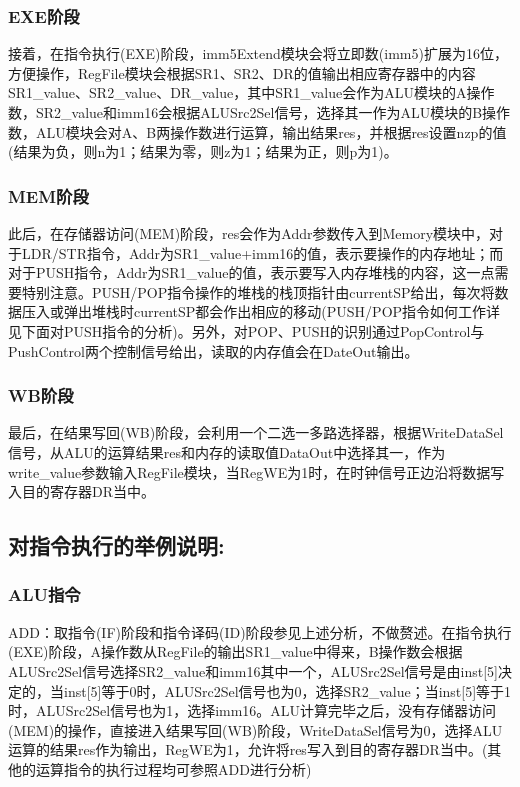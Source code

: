 \documentclass{article}
\begin{document}
\subsubsection{EXE阶段}
接着，在指令执行(EXE)阶段，imm5Extend模块会将立即数(imm5)扩展为16位，方便操作，RegFile模块会根据SR1、SR2、DR的值输出相应寄存器中的内容SR1\_value、SR2\_value、DR\_value，其中SR1\_value会作为ALU模块的A操作数，SR2\_value和imm16会根据ALUSrc2Sel信号，选择其一作为ALU模块的B操作数，ALU模块会对A、B两操作数进行运算，输出结果res，并根据res设置nzp的值(结果为负，则n为1；结果为零，则z为1；结果为正，则p为1)。

\subsubsection{MEM阶段}
此后，在存储器访问(MEM)阶段，res会作为Addr参数传入到Memory模块中，对于LDR/STR指令，Addr为SR1\_value+imm16的值，表示要操作的内存地址；而对于PUSH指令，Addr为SR1\_value的值，表示要写入内存堆栈的内容，这一点需要特别注意。PUSH/POP指令操作的堆栈的栈顶指针由currentSP给出，每次将数据压入或弹出堆栈时currentSP都会作出相应的移动(PUSH/POP指令如何工作详见下面对PUSH指令的分析)。另外，对POP、PUSH的识别通过PopControl与PushControl两个控制信号给出，读取的内存值会在DateOut输出。

\subsubsection{WB阶段}
最后，在结果写回(WB)阶段，会利用一个二选一多路选择器，根据WriteDataSel信号，从ALU的运算结果res和内存的读取值DataOut中选择其一，作为write\_value参数输入RegFile模块，当RegWE为1时，在时钟信号正边沿将数据写入目的寄存器DR当中。

\subsection{对指令执行的举例说明:}

\subsubsection{ALU指令}
ADD：取指令(IF)阶段和指令译码(ID)阶段参见上述分析，不做赘述。在指令执行(EXE)阶段，A操作数从RegFile的输出SR1\_value中得来，B操作数会根据ALUSrc2Sel信号选择SR2\_value和imm16其中一个，ALUSrc2Sel信号是由inst[5]决定的，当inst[5]等于0时，ALUSrc2Sel信号也为0，选择SR2\_value；当inst[5]等于1时，ALUSrc2Sel信号也为1，选择imm16。ALU计算完毕之后，没有存储器访问(MEM)的操作，直接进入结果写回(WB)阶段，WriteDataSel信号为0，选择ALU运算的结果res作为输出，RegWE为1，允许将res写入到目的寄存器DR当中。(其他的运算指令的执行过程均可参照ADD进行分析)
\end{document}
